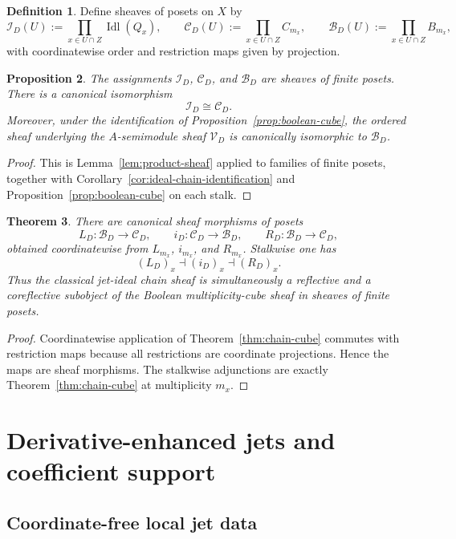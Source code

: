 \documentclass[11pt,a4paper]{article}
\newtheorem{theorem}{Theorem}[section]
\newtheorem{proposition}[theorem]{Proposition}
\theoremstyle{definition}
\newtheorem{definition}[theorem]{Definition}
\theoremstyle{remark}
\DeclareMathOperator{\Idl}{Idl}
\newcommand{\cV}{\mathcal V}
\newcommand{\cB}{\mathcal B}
\newcommand{\cI}{\mathcal I}
\newcommand{\cC}{\mathcal C}
\begin{document}
\begin{definition}
Define sheaves of posets on $X$ by
\[
\cI_D(U):=\prod_{x\in U\cap Z}\Idl(Q_x),
\qquad
\cC_D(U):=\prod_{x\in U\cap Z}C_{m_x},
\qquad
\cB_D(U):=\prod_{x\in U\cap Z}B_{m_x},
\]
with coordinatewise order and restriction maps given by projection.
\end{definition}

\begin{proposition}\label{prop:sheaves-posets}
The assignments $\cI_D$, $\cC_D$, and $\cB_D$ are sheaves of finite posets.  There is a canonical isomorphism
\[
\cI_D\cong\cC_D.
\]
Moreover, under the identification of Proposition~\ref{prop:boolean-cube}, the ordered sheaf underlying the $A$-semimodule sheaf $\cV_D$ is canonically isomorphic to $\cB_D$.
\end{proposition}

\begin{proof}
This is Lemma~\ref{lem:product-sheaf} applied to families of finite posets, together with Corollary~\ref{cor:ideal-chain-identification} and Proposition~\ref{prop:boolean-cube} on each stalk.
\end{proof}

\begin{theorem}\label{thm:sheafified-chain-cube}
There are canonical sheaf morphisms of posets
\[
L_D:\cB_D\to\cC_D,
\qquad
i_D:\cC_D\to\cB_D,
\qquad
R_D:\cB_D\to\cC_D,
\]
obtained coordinatewise from $L_{m_x}$, $i_{m_x}$, and $R_{m_x}$.  Stalkwise one has
\[
(L_D)_x\dashv (i_D)_x\dashv (R_D)_x.
\]
Thus the classical jet-ideal chain sheaf is simultaneously a reflective and a coreflective subobject of the Boolean multiplicity-cube sheaf in sheaves of finite posets.
\end{theorem}

\begin{proof}
Coordinatewise application of Theorem~\ref{thm:chain-cube} commutes with restriction maps because all restrictions are coordinate projections.  Hence the maps are sheaf morphisms.  The stalkwise adjunctions are exactly Theorem~\ref{thm:chain-cube} at multiplicity $m_x$.
\end{proof}

\section{Derivative-enhanced jets and coefficient support}

\subsection{Coordinate-free local jet data}
\end{document}
